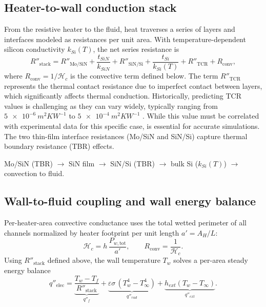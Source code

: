 \documentclass[11pt,a4paper]{article}
\begin{document}
\subsection{Heater-to-wall conduction stack}
From the resistive heater to the fluid, heat traverses a series of layers and interfaces modeled as resistances per unit area. With temperature-dependent silicon conductivity \(k_{Si}(T)\), the net series resistance is
\begin{equation}
  R''_\text{stack}=R''_{\text{Mo/SiN}}+\frac{t_{SiN}}{k_{SiN}}+R''_{\text{SiN/Si}}+\frac{t_{Si}}{k_{Si}(T)}+R''_\text{TCR}+R_\text{conv},
\end{equation}
where \(R_\text{conv}=1/\mathcal{H}_c\) is the convective term defined below. The term \(R''_\text{TCR}\) represents the thermal contact resistance due to imperfect contact between layers, which significantly affects thermal conduction. Historically, predicting TCR values is challenging as they can vary widely, typically ranging from \(\SI{5e-6}{m^2 K W^{-1}}\) to \(\SI{5e-4}{m^2 K W^{-1}}\) \cite{cengel2008introduction}. While this value must be correlated with experimental data for this specific case, is essential for accurate simulations. The two thin-film interface resistances (Mo/SiN and SiN/Si) capture thermal boundary resistance (TBR) effects.

\begin{tcolorbox}[colback=gray!5!white,colframe=gray!50!black,title=Conduction path: heater \(\to\) fluid,left=1mm,right=1mm,top=0.5mm,bottom=0.5mm]
Mo/SiN (TBR) \(\to\) SiN film \(\to\) SiN/Si (TBR) \(\to\) bulk Si (\(k_{Si}(T)\)) \(\to\) convection to fluid.
\end{tcolorbox}

\subsection{Wall-to-fluid coupling and wall energy balance}\label{sec:wallbalance}
Per-heater-area convective conductance uses the total wetted perimeter of all channels normalized by heater footprint per unit length \(a'=A_H/L\):
\begin{equation}
  \mathcal{H}_c = h\,\frac{P_{w,\text{tot}}}{a'},\qquad R_\text{conv}=\frac{1}{\mathcal{H}_c}.
\end{equation}
Using \(R''_\text{stack}\) defined above, the wall temperature \(T_w\) solves a per-area steady energy balance
\begin{equation}
  q''_\text{elec} = \underbrace{\frac{T_w-T_f}{R''_\text{stack}}}_{q''_f}+\underbrace{\varepsilon\sigma\,(T_w^4-T_\infty^4)}_{q''_{rad}}+\underbrace{h_{ext}(T_w-T_\infty)}_{q''_{ext}}.
\end{equation}
\end{document}
